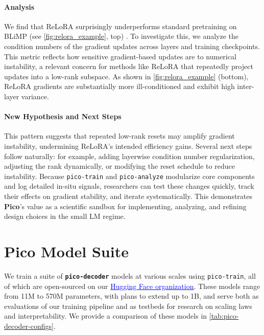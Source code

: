 \paragraph{Analysis} We find that ReLoRA surprisingly underperforms standard pretraining on BLiMP (see \cref{fig:relora_example}, top) \citep{warstadt2020blimp}. To investigate this, we analyze the condition numbers of the gradient updates across layers and training checkpoints. This metric reflects how sensitive gradient-based updates are to numerical instability, a relevant concern for methods like ReLoRA that repeatedly project updates into a low-rank subspace. As shown in \cref{fig:relora_example} (bottom), ReLoRA gradients are substantially more ill-conditioned and exhibit high inter-layer variance. 


\paragraph{New Hypothesis and Next Steps}
This pattern suggests that repeated low-rank resets may amplify gradient instability, undermining ReLoRA's intended efficiency gains. Several next steps follow naturally: for example, adding layerwise condition number regularization, adjusting the rank dynamically, or modifying the reset schedule to reduce instability. Because \texttt{pico-train} and \texttt{pico-analyze} modularize core components and log detailed in-situ signals, researchers can test these changes quickly, track their effects on gradient stability, and iterate systematically. This demonstrates \textbf{Pico}'s value as a scientific sandbox for implementing, analyzing, and refining design choices in the small LM regime.


\section{Pico Model Suite}

We train a suite of \textbf{\texttt{pico-decoder}} models at various scales using \texttt{pico-train}, all of which are open-sourced on our \href{https://huggingface.co/pico-lm}{\textcolor{blue}{Hugging Face organization}}. These models range from 11M to 570M parameters, with plans to extend up to 1B, and serve both as evaluations of our training pipeline and as testbeds for research on scaling laws and interpretability. We provide a comparison of these models in \cref{tab:pico-decoder-configs}.

